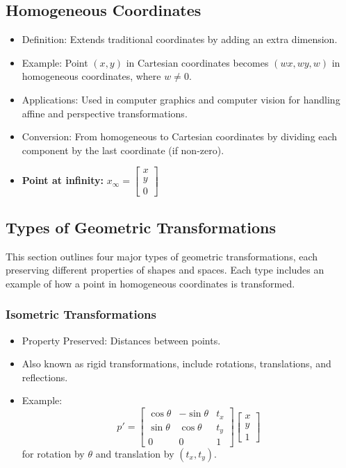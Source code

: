\documentclass[8pt, a4paper, landscape, includeheadfoot]{extarticle}
\begin{document}
\begin{multicols*}{4}
	\subsection{Homogeneous Coordinates}
	\begin{itemize}[itemsep=0pt, leftmargin=8pt]
		\item Definition: Extends traditional coordinates by adding an extra dimension.
		\item Example: Point \( (x, y) \) in Cartesian coordinates becomes \( (wx, wy, w) \) in homogeneous coordinates, where \( w \neq 0 \).
		\item Applications: Used in computer graphics and computer vision for handling affine and perspective transformations.
		\item Conversion: From homogeneous to Cartesian coordinates by dividing each component by the last coordinate (if non-zero).
		\item \textbf{Point at infinity: } $x_\infty = \begin{bmatrix}
				      x \\ y\\ 0
			      \end{bmatrix}$
	\end{itemize}

	\subsection{Types of Geometric Transformations}
	This section outlines four major types of geometric transformations, each preserving different properties of shapes and spaces. Each type includes an example of how a point in homogeneous coordinates is transformed.

	\subsubsection{Isometric Transformations}{}
	\begin{itemize}[itemsep=0pt, leftmargin=8pt]
		\item Property Preserved: Distances between points.
		\item Also known as rigid transformations, include rotations, translations, and reflections.
		\item Example:
		      $$
			      p' = \begin{bmatrix} \cos \theta & -\sin \theta & t_x \\ \sin \theta & \cos \theta & t_y \\ 0 & 0 & 1 \end{bmatrix} \begin{bmatrix} x \\ y \\ 1 \end{bmatrix}
		      $$
		      for rotation by \( \theta \) and translation by \( (t_x, t_y) \).
	\end{itemize}


\end{multicols*}
\end{document}
